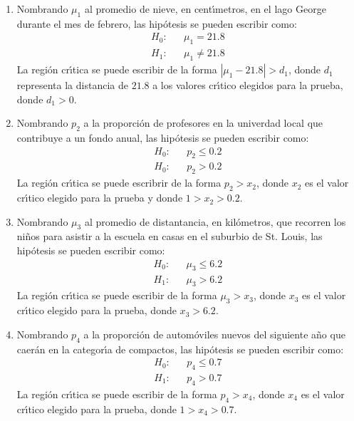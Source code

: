 \begin{solucion}
 $\phantom{0}$
 \begin{enumerate}
  \item Nombrando $\mu_1$ al promedio de nieve, en cent\'{\i}metros,
  en el lago George durante el mes de febrero,
  las hip\'otesis se pueden escribir como:
  \begin{eqnarray*}
   H_0: & & \mu_1   =  21.8 \\
   H_1: & & \mu_1 \neq 21.8
  \end{eqnarray*}
  La regi\'on cr\'{\i}tica se puede escribir
  de la forma $\left|\mu_1 - 21.8 \right| > d_1$,
  donde $d_1$ representa la distancia de $21.8$ a los valores cr\'{\i}tico
  elegidos para la prueba, donde $d_1 > 0$.
  
  \item Nombrando $p_2$ a la proporci\'on de profesores en la univerdad
  local que contribuye a un fondo anual,
  las hip\'otesis se pueden escribir como:
  \begin{eqnarray*}
   H_0: & & p_2 \leq 0.2 \\
   H_0: & & p_2 > 0.2
  \end{eqnarray*}
  La regi\'on cr\'{\i}tica se puede escribrir de la forma $p_2 > x_2$,
  donde $x_2$ es el valor cr\'{\i}tico elegido para la prueba
  y donde $1 > x_2 > 0.2$.
  
  \item Nombrando $\mu_3$ al promedio de distantancia, en kil\'ometros,
  que recorren los ni\~nos para asistir a la escuela
  en casas en el suburbio de St. Louis,
  las hip\'otesis se pueden escribir como:
  \begin{eqnarray*}
   H_0: & & \mu_3 \leq 6.2 \\
   H_1: & & \mu_3  >   6.2
  \end{eqnarray*}
  La regi\'on cr\'{\i}tica se puede escribir de la forma $\mu_3 > x_3$,
  donde $x_3$ es el valor cr\'{\i}tico elegido para la prueba,
  donde $x_3 > 6.2$.
  
  \item Nombrando $p_4$ a la proporci\'on de autom\'oviles nuevos
  del siguiente a\~no que caer\'an en la categor\'{\i}a de compactos,
  las hip\'otesis se pueden escribir como:
  \begin{eqnarray*}
   H_0: & & p_4 \leq 0.7 \\
   H_1: & & p_4   >  0.7
  \end{eqnarray*}
  La regi\'on cr\'{\i}tica se puede escribir de la forma $p_4 > x_4$,
  donde $x_4$ es el valor cr\'{\i}tico elegido para la prueba,
  donde $1 > x_4 > 0.7$.
  

\end{enumerate}
\end{solucion}
